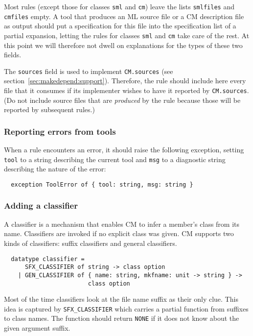 Most rules (except those for classes {\tt sml} and {\tt cm}) leave the
lists {\tt smlfiles} and {\tt cmfiles} empty.  A tool that produces an
ML source file or a CM description file as output should put a
specification for this file into the specification list of a partial
expansion, letting the rules for classes {\tt sml} and {\tt cm} take
care of the rest.  At this point we will therefore not dwell on
explanations for the types of these two fields.

The {\tt sources} field is used to implement {\tt CM.sources} (see
section~\ref{sec:makedepend:support}).  Therefore, the rule should
include here every file that it consumes if its implementer wishes to
have it reported by {\tt CM.sources}.  (Do not include source files
that are {\em produced} by the rule because those will be reported by
subsequent rules.)

\subsubsection{Reporting errors from tools}

When a rule encounters an error, it should raise the following
exception, setting {\tt tool} to a string describing the current tool
and {\tt msg} to a diagnostic string describing the nature of the
error:

\begin{lstlisting}
  exception ToolError of { tool: string, msg: string }
\end{lstlisting}%

\subsubsection{Adding a classifier}

A classifier is a mechanism that enables CM to infer a member's class
from its name.  Classifiers are invoked if no explicit class was
given.  CM supports two kinds of classifiers: suffix classifiers and
general classifiers.

\begin{lstlisting}
  datatype classifier =
      SFX_CLASSIFIER of string -> class option
    | GEN_CLASSIFIER of { name: string, mkfname: unit -> string } ->
                        class option
\end{lstlisting}%

Most of the time classifiers look at the file name suffix as their only
clue.  This idea is captured by {\tt SFX\_CLASSIFIER} which carries a
partial function from suffixes to class names.  The function should
return {\tt NONE} if it does not know about the given argument suffix.


